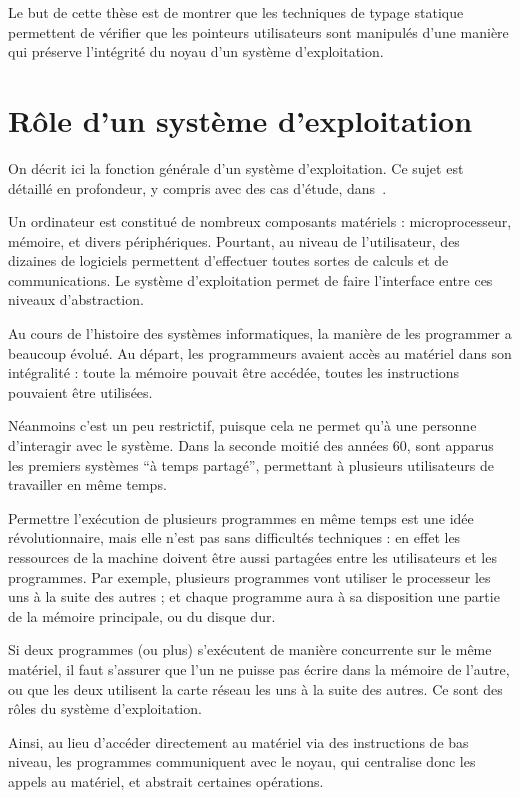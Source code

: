 Le but de cette thèse est de montrer que les techniques de typage statique
permettent de vérifier que les pointeurs utilisateurs sont manipulés d'une
manière qui préserve l'intégrité du noyau d'un système d'exploitation.

\section{Rôle d'un système d'exploitation}

On décrit ici la fonction générale d'un système d'exploitation. Ce sujet est
détaillé en profondeur, y compris avec des cas d'étude, dans~\cite{tanenbaum}.

Un ordinateur est constitué de nombreux composants matériels : microprocesseur,
mémoire, et divers périphériques. Pourtant, au niveau de l'utilisateur, des
dizaines de logiciels permettent d'effectuer toutes sortes de calculs et de
communications. Le système d'exploitation permet de faire l'interface entre ces
niveaux d'abstraction.

Au cours de l'histoire des systèmes informatiques, la manière de les programmer
a beaucoup évolué. Au départ, les programmeurs avaient accès au matériel dans
son intégralité : toute la mémoire pouvait être accédée, toutes les instructions
pouvaient être utilisées.

Néanmoins c'est un peu restrictif, puisque cela ne permet qu'à une personne
d'interagir avec le système. Dans la seconde moitié des années 60, sont apparus
les premiers systèmes ``à temps partagé'', permettant à plusieurs utilisateurs
de travailler en même temps.

Permettre l'exécution de plusieurs programmes en même temps est une idée
révolutionnaire, mais elle n'est pas sans difficultés techniques : en effet les
ressources de la machine doivent être aussi partagées entre les utilisateurs et
les programmes. Par exemple, plusieurs programmes vont utiliser le processeur
les uns à la suite des autres ; et chaque programme aura à sa disposition une
partie de la mémoire principale, ou du disque dur.

Si deux programmes (ou plus) s'exécutent de manière concurrente sur le même
matériel, il faut s'assurer que l'un ne puisse pas écrire dans la mémoire de
l'autre, ou que les deux utilisent la carte réseau les uns à la suite des
autres. Ce sont des rôles du système d'exploitation.

Ainsi, au lieu d'accéder directement au matériel via des instructions de bas
niveau, les programmes communiquent avec le noyau, qui centralise donc les
appels au matériel, et abstrait certaines opérations.


